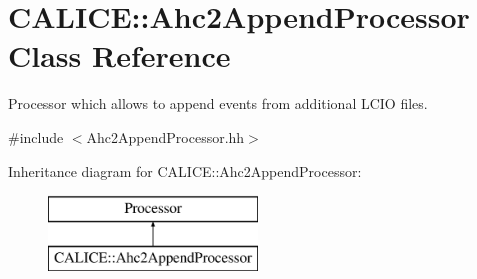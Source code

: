 \section{C\-A\-L\-I\-C\-E\-:\-:Ahc2\-Append\-Processor Class Reference}
\label{classCALICE_1_1Ahc2AppendProcessor}


Processor which allows to append events from additional L\-C\-I\-O files.  




{\ttfamily \#include $<$Ahc2\-Append\-Processor.\-hh$>$}

Inheritance diagram for C\-A\-L\-I\-C\-E\-:\-:Ahc2\-Append\-Processor\-:\begin{figure}[H]
\begin{center}
\leavevmode
\includegraphics[height=2.000000cm]{classCALICE_1_1Ahc2AppendProcessor}
\end{center}
\end{figure}
